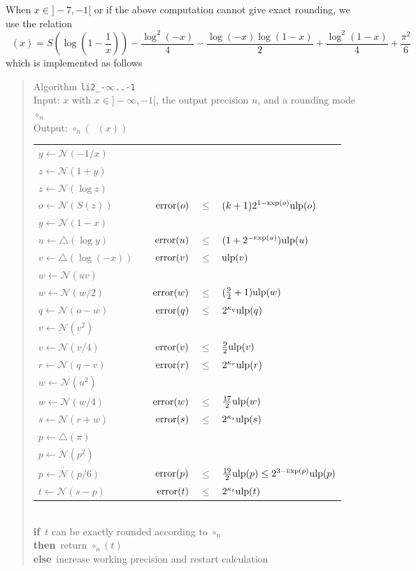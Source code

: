 \documentclass[12pt]{amsart}
\DeclareMathOperator{\LiTwo}{Li_2}
\def\n{\textnormal}
\def\pinf{\bigtriangleup}
\def\ulp{{\rm ulp}}
\def\Exp{{\rm \textsc exp}}
\def\N{{\mathcal N}}
\def\If{{\bf if}}
\def\then{{\bf then}}
\def\Else{{\bf else}}
\begin{document}
When $x \in ]-7, -1[$ or if the above computation cannot give exact rounding,
we use the relation
\[
\LiTwo(x) = S\left(\log\left(1-\frac{1}{x}\right)\right) - \frac{\log^2(-x)}{4}
- \frac{\log(-x) \log(1 - x)}{2} + \frac{\log^2(1-x)}{4} + \frac{\pi^2}{6}
\]
which is implemented as follows
\begin{quote}
Algorithm {\tt li2\_-$\infty$..-1}\\
Input: $x$ with $x \in ]-\infty, -1[$, the output precision $n$,
    and a rounding mode $\circ_n$ \\
Output: $\circ_n(\LiTwo(x))$ \\
\begin{tabular}{l c r c l}
$y \leftarrow \N(-1/x)$\\
$z \leftarrow \N(1+y)$\\
$z \leftarrow \N(\log z)$\\
$o \leftarrow \N(S(z))$ & & 
$\n{error}(o)$ & $\leq$ & $(k+1)2^{1-\Exp(o)}\ulp(o)$\\

$y \leftarrow \N(1-x)$\\
$u \leftarrow \pinf(\log y)$ & &
$\n{error}(u)$ & $\leq$ & $(1+2^{-\Exp(u)})\ulp(u)$\\
$v \leftarrow \pinf(\log(-x))$ & & $\n{error}(v)$ & $\leq$ & $\ulp(v)$\\
$w \leftarrow \N(uv)$\\
$w \leftarrow \N(w/2)$ & &
$\n{error}(w)$ & $\leq$ & $(\frac{9}{2}+1)\ulp(w)$\\
$q \leftarrow \N(o-w)$ & & $\n{error}(q)$ & $\leq$ & $2^{\kappa_q}\ulp(q)$\\

$v \leftarrow \N(v^2)$\\
$v \leftarrow \N(v/4)$ & & $\n{error}(v)$ & $\leq$ & $\frac{9}{2}\ulp(v)$\\
$r \leftarrow \N(q-v)$ & & $\n{error}(r)$ & $\leq$ & $2^{\kappa_r}\ulp(r)$\\

$w \leftarrow \N(u^2)$\\
$w \leftarrow \N(w/4)$ & &
$\n{error}(w)$ & $\leq$ & $\frac{17}{2}\ulp(w)$\\
$s \leftarrow \N(r+w)$ & &
$\n{error}(s)$ & $\leq$ & $2^{\kappa_s}\ulp(s)$\\

$p \leftarrow \pinf(\pi)$ \\
$p \leftarrow \N(p^2)$ \\
$p \leftarrow \N(p/6)$ & &
$\n{error}(p) $ & $ \leq $ & $\frac{19}{2}\ulp(p) \leq 2^{3-\Exp(p)}\ulp(p)$\\
$t \leftarrow \N(s - p)$ & &
$\n{error}(t) $ & $ \leq $ & $2^{\kappa_t} \ulp(t)$
\end{tabular}\\
\If\ $t$ can be exactly rounded according to $\circ_n$\\
\then\ return $\circ_n(t)$\\
\Else\ increase working precision and restart calculation
\end{quote}
\end{document}
